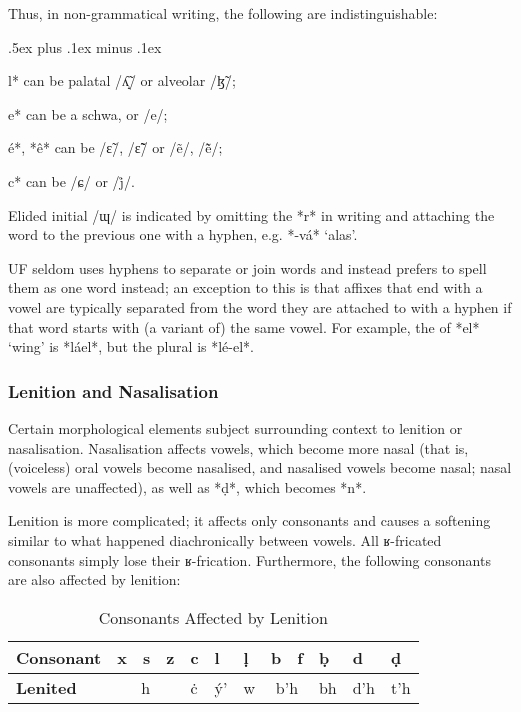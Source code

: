 \documentclass[a4paper, 12pt, oneside, final]{article}
\let \nf \normalfont
\begin{document}
\noindent Thus, in non-grammatical writing, the following are indistinguishable:
\begin{items}\itemsep .5ex plus .1ex minus .1ex\relax
\item *l* can be palatal /ʎ̝̃/ or alveolar /ɮ̃/;
\item *e* can be a schwa, or /e/;
\item *é*, *ê* can be /ɛ̃/, /ɛ̃̃/ or /ẽ/, /ẽ̃/;
\item *c* can be /ɕ/ or /j̊/.
\end{items}

\noindent Elided initial /ɰ/ is indicated by omitting the *r* in writing and attaching the word to the previous one with a hyphen,
e.g. *-vá* ‘alas’.

UF seldom uses hyphens to separate or join words and instead prefers to spell them as one word instead; an exception
to this is that affixes that end with a vowel are typically separated from the word they are attached to with a hyphen
if that word starts with (a variant of) the same vowel. For example, the  of *el* ‘wing’
is *láel*, but the plural is *lé-el*.

\subsubsection{Lenition and Nasalisation}
Certain morphological elements subject surrounding context to lenition or nasalisation. Nasalisation affects vowels,
which become more nasal (that is, (voiceless) oral vowels become nasalised, and nasalised vowels become nasal; nasal
vowels are unaffected), as well as *ḍ*, which becomes *n*.

Lenition is more complicated; it affects only consonants and causes a softening similar to what happened diachronically
between vowels. All ʁ-fricated consonants simply lose their ʁ-frication. Furthermore, the
following consonants are also affected by lenition:

\begin{table}[H]
\centering
\itshape
\begin{tabular}{l|lll|l|l|l|ll|l|l|l|}
\bf Consonant & x & s & z       & c & l  & ḷ & b & f          & ḅ   & d   & ḍ    \\\hline
\bf Lenited & \multicolumn{3}{c|}{h} & ċ & ý’ & w & \multicolumn{2}{c|}{b’h} & bh  & d’h & t’h  \\
\end{tabular}
\nf
\caption{Consonants Affected by Lenition}\label{tab:lenition}
\end{table}
\end{document}

